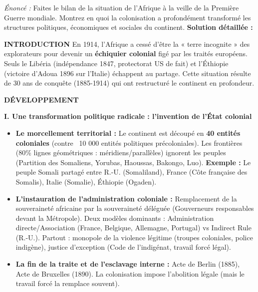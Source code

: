 \documentclass[11pt]{article}
\newcommand{\cle}[1]{{\popxbold\color{popdark}#1}}
\begin{document}
\begin{exoresolu}
\emph{Énoncé :} Faites le bilan de la situation de l'Afrique à la veille de la Première Guerre mondiale. Montrez en quoi la colonisation a profondément transformé les structures politiques, économiques et sociales du continent.
\tcblower
\textbf{Solution détaillée :}

\textbf{INTRODUCTION}
En 1914, l'Afrique a cessé d'être la « terre incognite » des explorateurs pour devenir un \textbf{échiquier colonial} figé par les traités européens. Seuls le \cle{Libéria} (indépendance 1847, protectorat US de fait) et l'\cle{Éthiopie} (victoire d'\cle{Adoua} 1896 sur l'Italie) échappent au partage. Cette situation résulte de 30 ans de conquête (1885-1914) qui ont restructuré le continent en profondeur.

\textbf{DÉVELOPPEMENT}

\textbf{I. Une transformation politique radicale : l'invention de l'État colonial}
\begin{itemize}
    \item \textbf{Le morcellement territorial :} Le continent est découpé en \textbf{40 entités coloniales} (contre ~10 000 entités politiques précoloniales). Les frontières (80\% lignes géométriques : méridiens/parallèles) ignorent les peuples (\cle{Partition des Somaliens, Yorubas, Haoussas, Bakongo, Luo}). \textbf{Exemple :} Le peuple \cle{Somali} partagé entre R.-U. (Somaliland), France (Côte française des Somalis), Italie (Somalie), Éthiopie (Ogaden).
    \item \textbf{L'instauration de l'administration coloniale :} Remplacement de la souveraineté africaine par la \cle{souveraineté déléguée} (Gouverneurs responsables devant la Métropole). Deux modèles dominants : \cle{Administration directe/Association} (France, Belgique, Allemagne, Portugal) vs \cle{Indirect Rule} (R.-U.). Partout : \cle{monopole de la violence légitime} (troupes coloniales, police indigène), \cle{justice d'exception} (Code de l'indigénat, travail forcé légal).
    \item \textbf{La fin de la traite et de l'esclavage interne :} \cle{Acte de Berlin (1885), Acte de Bruxelles (1890)}. La colonisation impose l'abolition légale (mais le travail forcé la remplace souvent).
\end{itemize}


\end{exoresolu}
\end{document}
